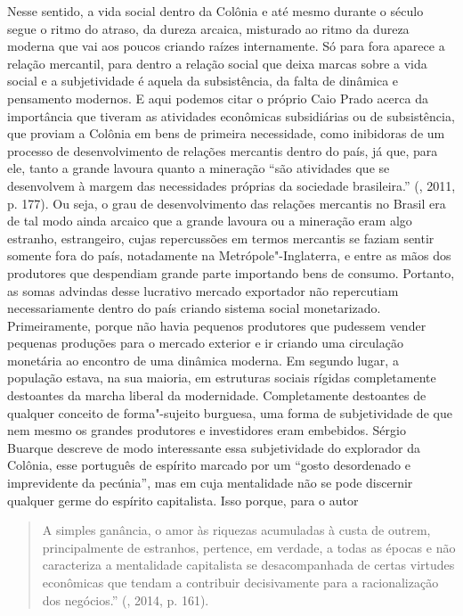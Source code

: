 Nesse sentido, a vida social dentro da Colônia e até mesmo durante o
século  segue o ritmo do atraso, da dureza arcaica, misturado ao
ritmo da dureza moderna que vai aos poucos criando raízes internamente.
Só para fora aparece a relação mercantil, para dentro a relação social
que deixa marcas sobre a vida social e a subjetividade é aquela da
subsistência, da falta de dinâmica e pensamento modernos. E aqui podemos
citar o próprio Caio Prado acerca da importância que tiveram as
atividades econômicas subsidiárias ou de subsistência, que proviam a
Colônia em bens de primeira necessidade, como inibidoras de um processo
de desenvolvimento de relações mercantis dentro do país, já que, para
ele, tanto a grande lavoura quanto a mineração ``são atividades que se
desenvolvem à margem das necessidades próprias da sociedade
brasileira.'' (, 2011, p. 177). Ou seja, o grau de desenvolvimento
das relações mercantis no Brasil era de tal modo ainda arcaico que a
grande lavoura ou a mineração eram algo estranho, estrangeiro, cujas
repercussões em termos mercantis se faziam sentir somente fora do país,
notadamente na Metrópole"-Inglaterra, e entre as mãos dos produtores que
despendiam grande parte importando bens de consumo. Portanto, as somas
advindas desse lucrativo mercado exportador não repercutiam
necessariamente dentro do país criando sistema social monetarizado.
Primeiramente, porque não havia pequenos produtores que pudessem vender
pequenas produções para o mercado exterior e ir criando uma circulação
monetária ao encontro de uma dinâmica moderna. Em segundo lugar, a
população estava, na sua maioria, em estruturas sociais rígidas
completamente destoantes da marcha liberal da modernidade. Completamente
destoantes de qualquer conceito de forma"-sujeito burguesa, uma forma de
subjetividade de que nem mesmo os grandes produtores e investidores eram
embebidos. Sérgio Buarque descreve de modo interessante essa
subjetividade do explorador da Colônia, esse português de espírito
marcado por um ``gosto desordenado e imprevidente da pecúnia'', mas em
cuja mentalidade não se pode discernir qualquer germe do espírito
capitalista. Isso porque, para o autor

\begin{quote}
A simples ganância, o amor às riquezas acumuladas à custa de outrem,
principalmente de estranhos, pertence, em verdade, a todas as épocas e
não caracteriza a mentalidade capitalista se desacompanhada de certas
virtudes econômicas que tendam a contribuir decisivamente para a
racionalização dos negócios.'' (, 2014, p. 161).
\end{quote}

